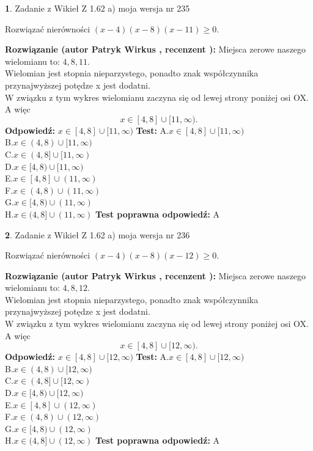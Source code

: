 \documentclass[12pt, a4paper]{article}
\theoremstyle{definition} %
\newtheorem{zad}{}
\newcommand{\zadStart}[1]{\begin{zad}#1\newline}
\newcommand{\zadStop}{\end{zad}}
\newcommand{\rozwStart}[2]{\noindent \textbf{Rozwiązanie (autor #1 , recenzent #2): }\newline}
\newcommand{\rozwStop}{\newline}
\newcommand{\odpStart}{\noindent \textbf{Odpowiedź:}\newline}
\newcommand{\odpStop}{\newline}
\newcommand{\testStart}{\noindent \textbf{Test:}\newline}
\newcommand{\testStop}{\newline}
\newcommand{\kluczStart}{\noindent \textbf{Test poprawna odpowiedź:}\newline}
\newcommand{\kluczStop}{\newline}
\begin{document}
\zadStart{Zadanie z Wikieł Z 1.62 a) moja wersja nr 235}

Rozwiązać nierówności $(x-4)(x-8)(x-11)\ge0$.
\zadStop
\rozwStart{Patryk Wirkus}{}
Miejsca zerowe naszego wielomianu to: $4, 8, 11$.\\
Wielomian jest stopnia nieparzystego, ponadto znak współczynnika przy\linebreak najwyższej potędze x jest dodatni.\\ W związku z tym wykres wielomianu zaczyna się od lewej strony poniżej osi OX. A więc $$x \in [4,8] \cup [11,\infty).$$
\rozwStop
\odpStart
$x \in [4,8] \cup [11,\infty)$
\odpStop
\testStart
A.$x \in [4,8] \cup [11,\infty)$\\
B.$x \in (4,8) \cup [11,\infty)$\\
C.$x \in (4,8] \cup [11,\infty)$\\
D.$x \in [4,8) \cup [11,\infty)$\\
E.$x \in [4,8] \cup (11,\infty)$\\
F.$x \in (4,8) \cup (11,\infty)$\\
G.$x \in [4,8) \cup (11,\infty)$\\
H.$x \in (4,8] \cup (11,\infty)$
\testStop
\kluczStart
A
\kluczStop



\zadStart{Zadanie z Wikieł Z 1.62 a) moja wersja nr 236}

Rozwiązać nierówności $(x-4)(x-8)(x-12)\ge0$.
\zadStop
\rozwStart{Patryk Wirkus}{}
Miejsca zerowe naszego wielomianu to: $4, 8, 12$.\\
Wielomian jest stopnia nieparzystego, ponadto znak współczynnika przy\linebreak najwyższej potędze x jest dodatni.\\ W związku z tym wykres wielomianu zaczyna się od lewej strony poniżej osi OX. A więc $$x \in [4,8] \cup [12,\infty).$$
\rozwStop
\odpStart
$x \in [4,8] \cup [12,\infty)$
\odpStop
\testStart
A.$x \in [4,8] \cup [12,\infty)$\\
B.$x \in (4,8) \cup [12,\infty)$\\
C.$x \in (4,8] \cup [12,\infty)$\\
D.$x \in [4,8) \cup [12,\infty)$\\
E.$x \in [4,8] \cup (12,\infty)$\\
F.$x \in (4,8) \cup (12,\infty)$\\
G.$x \in [4,8) \cup (12,\infty)$\\
H.$x \in (4,8] \cup (12,\infty)$
\testStop
\kluczStart
A
\kluczStop
\end{document}
